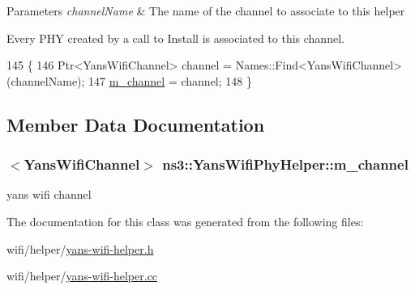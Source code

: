 \begin{DoxyParams}{Parameters}
{\em channel\+Name} & The name of the channel to associate to this helper\\
\hline
\end{DoxyParams}
Every P\+HY created by a call to Install is associated to this channel. 
\begin{DoxyCode}
145 \{
146   Ptr<YansWifiChannel> channel = Names::Find<YansWifiChannel> (channelName);
147   \hyperlink{classns3_1_1YansWifiPhyHelper_a365e8788b442b350030328a95df52ad7}{m\_channel} = channel;
148 \}
\end{DoxyCode}


\subsection{Member Data Documentation}
\subsubsection[{\texorpdfstring{m\+\_\+channel}{m_channel}}]{$<${\bf Yans\+Wifi\+Channel}$>$ ns3\+::\+Yans\+Wifi\+Phy\+Helper\+::m\+\_\+channel\hspace{0.3cm}{\ttfamily [private]}}\hypertarget{classns3_1_1YansWifiPhyHelper_a365e8788b442b350030328a95df52ad7}{}\label{classns3_1_1YansWifiPhyHelper_a365e8788b442b350030328a95df52ad7}


yans wifi channel 



The documentation for this class was generated from the following files\+:\begin{DoxyCompactItemize}
\item 
wifi/helper/\hyperlink{yans-wifi-helper_8h}{yans-\/wifi-\/helper.\+h}\item 
wifi/helper/\hyperlink{yans-wifi-helper_8cc}{yans-\/wifi-\/helper.\+cc}\end{DoxyCompactItemize}
